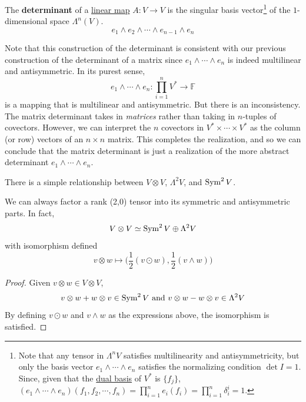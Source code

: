 	\begin{definition}[Determinant]
	  \label{def:determinant-2}
		The \textbf{determinant} of a \hyperref[def:linear_map]{linear map} $A: V \to V$ is the singular basis vector\footnote{Note that any tensor in $\Lambda^n V$ satisfies multilinearity and antisymmetricity, but only the basis vector $e_1 \wedge \cdots \wedge e_n$ satisfies the normalizing condition $\det{I} = 1$. Since, given that the \hyperref[def:dual-basis]{dual basis} of $V^*$ is $\{f_j\}$, $(e_1 \wedge \cdots \wedge e_n) (f_1, f_2, \cdots, f_n) = \prod_{i=1}^n e_i (f_i) = \prod_{i=1}^n \delta_i^i = 1$. } of the $1$-dimensional space $\Lambda^n (V)$. 
		\begin{equation}
    	e_1 \wedge e_2 \wedge \cdots \wedge e_{n-1} \wedge e_n
		\end{equation}
  \end{definition}

	Note that this construction of the determinant is consistent with our previous construction of the determinant of a matrix since $e_1 \wedge \cdots \wedge e_n$ is indeed multilinear and antisymmetric. In its purest sense, 
	\begin{equation}
		e_1 \wedge \cdots \wedge e_n: \prod_{i=1}^n V^* \to \mathbb{F}
	\end{equation}
	is a mapping that is multilinear and antisymmetric. But there is an inconsistency. The matrix determinant takes in \textit{matrices} rather than taking in $n$-tuples of covectors. However, we can interpret the $n$ covectors in $V^* \times \cdots \times V^*$ as the column (or row) vectors of an $n \times n$ matrix. This completes the realization, and so we can conclude that the matrix determinant is just a realization of the more abstract determinant $e_1 \wedge \cdots \wedge e_n$. 

  There is a simple relationship between $V \otimes V$, $\Lambda^2 V$, and $\operatorname{Sym}^2 V$. 

	\begin{theorem}
	  \label{thm:symmetric-antisymmetric-decomposition}
    We can always factor a rank (2,0) tensor into its symmetric and antisymmetric parts. In fact, 
		\begin{equation}
    	V \otimes V \simeq \operatorname{Sym}^2 V \oplus \Lambda^2 V
		\end{equation}
    with isomorphism defined
		\begin{equation}
    	v \otimes w \mapsto \Big( \frac{1}{2} (v \odot w), \frac{1}{2} (v \wedge w) \Big)
		\end{equation}
  \end{theorem}
  \begin{proof}
    Given $v \otimes w \in V \otimes V$, 
		\begin{equation}
    	v \otimes w + w \otimes v \in \operatorname{Sym}^2 V \text{ and } v \otimes w - w \otimes v \in \Lambda^2 V
		\end{equation}
    By defining $v \odot w$ and $v \wedge w$ as the expressions above, the isomorphism is satisfied. 
  \end{proof}

